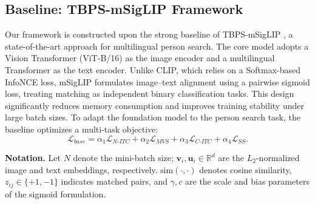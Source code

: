 \documentclass{article}
\begin{document}
\subsection{Baseline: TBPS-mSigLIP Framework}
Our framework is constructed upon the strong baseline of TBPS-mSigLIP \cite{tran2025multilingual}, a state-of-the-art approach for multilingual person search. The core model adopts a Vision Transformer (ViT-B/16) as the image encoder and a multilingual Transformer as the text encoder. Unlike CLIP, which relies on a Softmax-based InfoNCE loss, mSigLIP formulates image--text alignment using a pairwise sigmoid loss, treating matching as independent binary classification tasks. This design significantly reduces memory consumption and improves training stability under large batch sizes. To adapt the foundation model to the person search task, the baseline optimizes a multi-task objective:
\begin{equation}
\mathcal{L}_{base}
= \alpha_1 \mathcal{L}_{N\text{-}ITC}
+ \alpha_2 \mathcal{L}_{MVS}
+ \alpha_3 \mathcal{L}_{C\text{-}ITC}
+ \alpha_4 \mathcal{L}_{SS}.
\end{equation}

\noindent\textbf{Notation.}
Let $N$ denote the mini-batch size; $\mathbf{v}_i, \mathbf{u}_i \in \mathbb{R}^d$ are the $L_2$-normalized image and text embeddings, respectively.
$\text{sim}(\cdot,\cdot)$ denotes cosine similarity, $z_{ij}\!\in\!\{+1,-1\}$ indicates matched pairs, and $\gamma, c$ are the scale and bias parameters of the sigmoid formulation.
\end{document}
